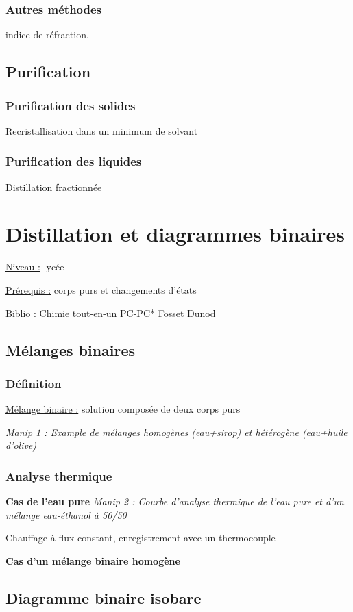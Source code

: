 \documentclass{article}%
\begin{document}
\subsubsection{Autres méthodes}
indice de réfraction, 
\subsection{Purification}
\subsubsection{Purification des solides}
Recristallisation dans un minimum de solvant
\subsubsection{Purification des liquides}
Distillation fractionnée
\section{Distillation et diagrammes binaires}
\underline{Niveau :} lycée

\underline{Prérequis :} corps purs et changements d'états

\underline{Biblio :} Chimie tout-en-un PC-PC* Fosset Dunod

\subsection{Mélanges binaires}
\subsubsection{Définition}
\underline{Mélange binaire :} solution composée de deux corps purs

\textit{Manip 1 : Example de mélanges homogènes (eau+sirop) et hétérogène (eau+huile d'olive)} 
\subsubsection{Analyse thermique}
\textbf{Cas de l'eau pure}
\textit{Manip 2 : Courbe d'analyse thermique de l'eau pure et d'un mélange eau-éthanol à 50/50}

Chauffage à flux constant, enregistrement avec un thermocouple

\textbf{Cas d'un mélange binaire homogène}
\subsection{Diagramme binaire isobare}
\end{document}
